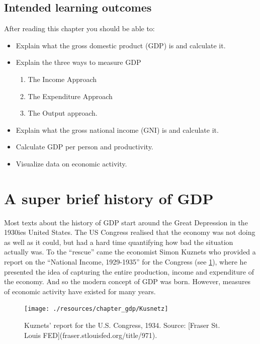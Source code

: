 \documentclass[
]{book}
\providecommand{\tightlist}{%
  \setlength{\itemsep}{0pt}\setlength{\parskip}{0pt}}
\begin{document}
\hypertarget{intended-learning-outcomes}{%
\subsection{Intended learning outcomes}\label{intended-learning-outcomes}}

After reading this chapter you should be able to:

\begin{itemize}
\tightlist
\item
  Explain what the gross domestic product (GDP) is and calculate it.
\item
  Explain the three ways to measure GDP

  \begin{enumerate}
  \def\labelenumi{\arabic{enumi}.}
  \tightlist
  \item
    The Income Approach
  \item
    The Expenditure Approach
  \item
    The Output approach.
  \end{enumerate}
\item
  Explain what the gross national income (GNI) is and calculate it.
\item
  Calculate GDP per person and productivity.
\item
  Visualize data on economic activity.
\end{itemize}

\hypertarget{a-super-brief-history-of-gdp}{%
\section{A super brief history of GDP}\label{a-super-brief-history-of-gdp}}

Most texts about the history of GDP start around the Great Depression in the 1930ies United States. The US Congress realised that the economy was not doing as well as it could, but had a hard time quantifying how bad the situation actually was. To the ``rescue'' came the economist Simon Kuznets who provided a report on the ``National Income, 1929-1935'' for the Congress (see \ref{fig:gdp1}), where he presented the idea of capturing the entire production, income and expenditure of the economy. And so the modern concept of GDP was born. However, measures of economic activity have existed for many years.

\begin{figure}

{\centering \texttt{[image: ./resources/chapter\_gdp/Kusnetz]} 

}

\caption{Kuznets' report for the U.S. Congress, 1934. Source:  [Fraser St. Louis FED](fraser.stlouisfed.org/title/971).}\label{fig:gdp1}
\end{figure}
\end{document}

